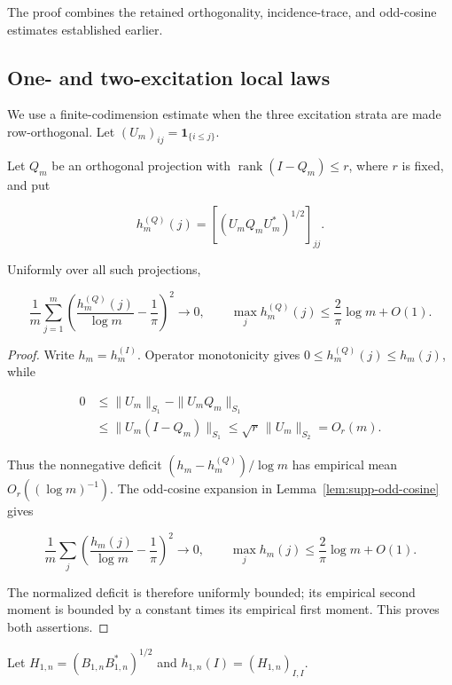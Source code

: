 The proof combines the retained orthogonality, incidence-trace, and odd-cosine
estimates established earlier.

\subsection{One- and two-excitation local laws}

We use a finite-codimension estimate when the three excitation strata are
made row-orthogonal. Let
\((U_m)_{ij}=\mathbf1_{\{i\le j\}}\).

\begin{lemma}
\label{lem:supp-finite-codimension}
Let \(Q_m\) be an orthogonal projection with
\(\operatorname{rank}(I-Q_m)\le r\), where \(r\) is fixed, and put

\[
 h_m^{(Q)}(j)=
 \left[(U_mQ_mU_m^*)^{1/2}\right]_{jj}.
\]

Uniformly over all such projections,

\begin{equation}\label{eq:supp-finite-codimension-local}
 \frac1m\sum_{j=1}^m
 \left(\frac{h_m^{(Q)}(j)}{\log m}-\frac1\pi\right)^2
 \longrightarrow0,
 \qquad
 \max_jh_m^{(Q)}(j)\le\frac2\pi\log m+O(1).
\end{equation}
\end{lemma}

\begin{proof}
Write \(h_m=h_m^{(I)}\).  Operator monotonicity gives
\(0\le h_m^{(Q)}(j)\le h_m(j)\), while

\begin{align*}
 0&\le \|U_m\|_{S_1}-\|U_mQ_m\|_{S_1}\\
 &\le \|U_m(I-Q_m)\|_{S_1}
 \le \sqrt r\,\|U_m\|_{S_2}=O_r(m).
\end{align*}

Thus the nonnegative deficit
\((h_m-h_m^{(Q)})/\log m\) has empirical mean
\(O_r((\log m)^{-1})\).  The odd-cosine expansion in
Lemma~\ref{lem:supp-odd-cosine} gives

\[
 \frac1m\sum_j
 \left(\frac{h_m(j)}{\log m}-\frac1\pi\right)^2\to0,
 \qquad
 \max_jh_m(j)\le\frac2\pi\log m+O(1).
\]

The normalized deficit is therefore uniformly bounded; its empirical
second moment is bounded by a constant times its empirical first moment.
This proves both assertions.
\end{proof}

Let
\(H_{1,n}=(B_{1,n}B_{1,n}^*)^{1/2}\) and
\(h_{1,n}(I)=(H_{1,n})_{I,I}\).

